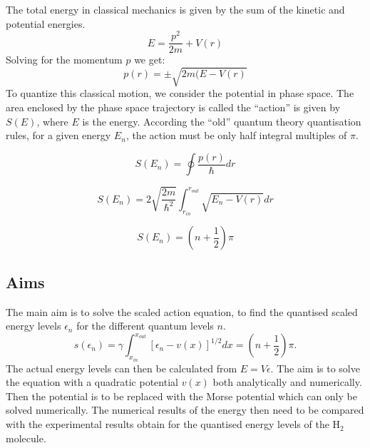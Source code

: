 \documentclass[a4paper]{IEEEtran}
\begin{document}
      The total energy in classical mechanics is given by the sum of the kinetic and potential
      energies.
      \begin{equation}
            E = \frac{p^2}{2m} + V(r)
      \end{equation}
      Solving for the momentum $p$ we get:
      \begin{equation}
            p(r) = \pm\sqrt{2m(E-V(r)}
      \end{equation}
      To quantize this classical motion, we consider the potential in
      phase space. The area enclosed by the phase space trajectory is
      called the ``action'' is given by $S(E)$, where $E$ is the
      energy. According the ``old'' quantum theory quantisation rules,
      for a given energy $E_n$, the action must be only half integral
      multiples of $\pi$. 

      \begin{equation}
      S(E_n) = \oint \frac{p(r)}{\hbar} dr 
      \end{equation}

      \begin{equation}
      S(E_n) = 
             2\sqrt{\frac{2m}{\hbar^2}} 
             \int_{r_{in}}^{r_{out}} \sqrt{E_n - V(r)} dr 
      \end{equation}

      \begin{equation}
      S(E_n) = 
             \left(n + \frac{1}{2} \right)\pi
      \end{equation}

      

\subsection{Aims}

    The main aim is to solve the scaled action equation, to find the quantised
    scaled energy levels $\epsilon_n$ for the different quantum levels $n$.
    \begin{equation}
        \label{main}
        s(\epsilon_n) = 
            \gamma\int_{x_{in}}^{x_{out}} [\epsilon_n - v(x)]^{1/2} dx =
            \left( n + \frac{1}{2} \right)\pi.
    \end{equation}
    The actual energy levels can then be calculated from $E = V\epsilon$.
    The aim is to solve the equation with a quadratic potential $v(x)$
    both analytically and numerically. Then the potential is to be
    replaced with the Morse potential which can only be solved
    numerically. The numerical results of the energy then need to be
    compared with the experimental results obtain for the quantised
    energy levels of the $\mathrm{H_2}$ molecule.
\end{document}
